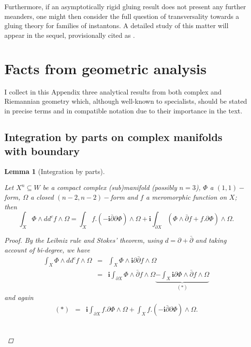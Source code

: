 \documentclass{article}
\newtheorem{lemma}[theorem]{Lemma}
\begin{document}
Furthermore, if an asymptotically rigid gluing result does not present any further meanders, one might then consider the full question of transversality towards a gluing theory for families of instantons.
A detailed study of this matter will appear in the sequel, provisionally cited as \cite{G2II}.

\newpage
\appendix

\section{Facts from geometric analysis}
\label{App exterior algebra}

I collect in this Appendix three analytical results from both complex and Riemannian geometry which, although well-known to specialists, should be stated in precise terms and in compatible notation due to their importance in the text. 

\subsection{Integration by parts on complex manifolds with boundary}
\begin{lemma}[Integration by parts]\label{Lemma integration by parts on W}

Let $X^{n}\subseteq W$ be a compact complex (sub)manifold (possibly $n=3$), $\Phi $ a $\left( 1,1\right)-$form, $\Omega $ a closed $\left( n-2,n-2\right) -$form and $f$ a
meromorphic function on $X$; then 
\begin{equation*}
        \int_{X}
        \Phi \wedge dd^{c}f\wedge \Omega 
        =\int_{X}
        f.\left( -\mathbf{i}\bar{\partial}\partial \Phi \right) \wedge \Omega         +\mathbf{i}\int_{\partial X}
        \left( \Phi \wedge \bar{\partial}f+f.\partial \Phi \right)\wedge\Omega.
\end{equation*}
\begin{proof}
By the Leibniz rule and Stokes' theorem, using $d=\partial +\bar{\partial}$
and taking account of bi-degree, we have%
\begin{eqnarray*}
\int_{X}\Phi \wedge dd^{c}f\wedge \Omega &=&\int_{X}\Phi \wedge \mathbf{i}%
\partial \bar{\partial}f\wedge \Omega \\
&=&\mathbf{i}\int_{\partial X}\Phi \wedge \bar{\partial}f\wedge \Omega 
\underset{\left( \ast \right) }{\underbrace{-\int_{X}\mathbf{i}\partial \Phi
\wedge \bar{\partial}f\wedge \Omega }}
\end{eqnarray*}%
and again%
\begin{eqnarray*}
\left( \ast \right) &=&\mathbf{i}\int_{\partial X}f.\partial \Phi \wedge
\Omega +\int_{X}f.\left( -\mathbf{i}\bar{\partial}\partial \Phi \right)
\wedge \Omega .
\end{eqnarray*}
\vspace{-1.3cm}\[\qedhere\]
\end{proof}
\end{lemma}
\end{document}
